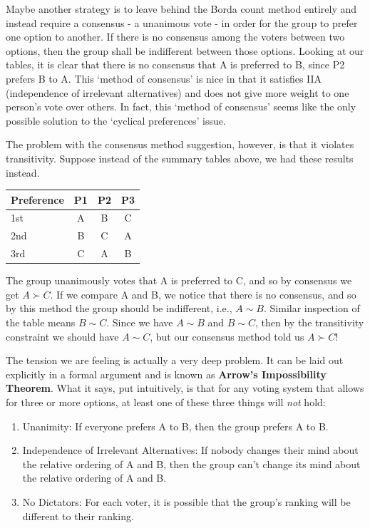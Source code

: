 \documentclass[]{tufte-book}
\providecommand{\tightlist}{%
  \setlength{\itemsep}{0pt}\setlength{\parskip}{0pt}}
\begin{document}
Maybe another strategy is to leave behind the Borda count method entirely and instead require a consensus - a unanimous vote - in order for the group to prefer one option to another. If there is no consensus among the voters between two options, then the group shall be indifferent between those options. Looking at our tables, it is clear that there is no consensus that A is preferred to B, since P2 prefers B to A. This `method of consensus' is nice in that it satisfies IIA (independence of irrelevant alternatives) and does not give more weight to one person's vote over others. In fact, this `method of consensus' seems like the only possible solution to the `cyclical preferences' issue.

The problem with the consensus method suggestion, however, is that it violates transitivity. Suppose instead of the summary tables above, we had these results instead.

\begin{longtable}[]{@{}lccc@{}}
\toprule
Preference & P1 & P2 & P3\tabularnewline
\midrule
\endhead
1st & A & B & C\tabularnewline
2nd & B & C & A\tabularnewline
3rd & C & A & B\tabularnewline
\bottomrule
\end{longtable}

The group unanimously votes that A is preferred to C, and so by consensus we get \(A\succ C\). If we compare A and B, we notice that there is no consensus, and so by this method the group should be indifferent, i.e., \(A\sim B\). Similar inspection of the table means \(B\sim C\). Since we have \(A\sim B\) and \(B\sim C\), then by the transitivity constraint we should have \(A\sim C\), but our consensus method told us \(A\succ C\)!

The tension we are feeling is actually a very deep problem. It can be laid out explicitly in a formal argument and is known as \textbf{Arrow's Impossibility Theorem}. What it says, put intuitively, is that for any voting system that allows for three or more options, at least one of these three things will \emph{not} hold:

\begin{enumerate}
\def\labelenumi{\arabic{enumi}.}
\tightlist
\item
  Unanimity: If everyone prefers A to B, then the group prefers A to B.
\item
  Independence of Irrelevant Alternatives: If nobody changes their mind about the relative ordering of A and B, then the group can't change its mind about the relative ordering of A and B.
\item
  No Dictators: For each voter, it is possible that the group's ranking will be different to their ranking.
\end{enumerate}
\end{document}
